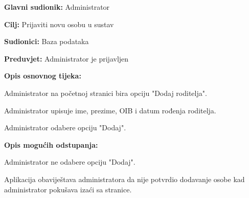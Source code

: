					
					\noindent {}
					\begin{packed_item}
						
						\item \textbf{Glavni sudionik: }Administrator
						\item  \textbf{Cilj:} Prijaviti novu osobu u sustav
						\item  \textbf{Sudionici:} Baza podataka
						\item  \textbf{Preduvjet:} Administrator je prijavljen
						\item  \textbf{Opis osnovnog tijeka:}
						
						\item[] \begin{packed_enum}
							
							\item Administrator na početnoj stranici bira opciju "Dodaj roditelja".
							\item Administrator upisuje ime, prezime, OIB i datum rođenja roditelja.
							\item Administrator odabere opciju "Dodaj".
						\end{packed_enum}
						
						\item  \textbf{Opis mogućih odstupanja:}
						
						\item[] \begin{packed_item}
							
							\item[3.a] Administrator ne odabere opciju "Dodaj".
							\item[] \begin{packed_enum}
								
								\item Aplikacija obaviještava administratora da nije potvrdio dodavanje osobe kad administrator pokušava izaći sa stranice.
							\end{packed_enum}
							
							
						\end{packed_item}
						
						
					\end{packed_item}
					
